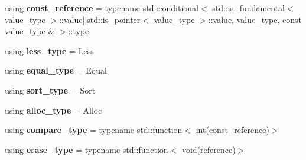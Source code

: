 \begin{DoxyCompactItemize}
\item 
\hypertarget{classrs_1_1_lazy_flat_set_a1eee0250aeecaaa0bc0c52ed44c44103}{using {\bfseries const\+\_\+reference} = typename std\+::conditional$<$ std\+::is\+\_\+fundamental$<$ value\+\_\+type $>$\+::value$\vert$$\vert$std\+::is\+\_\+pointer$<$ value\+\_\+type $>$\+::value, value\+\_\+type, const value\+\_\+type \& $>$\+::type}\label{classrs_1_1_lazy_flat_set_a1eee0250aeecaaa0bc0c52ed44c44103}

\item 
\hypertarget{classrs_1_1_lazy_flat_set_ad62702a8dd24dd6994f6de93a95ac06b}{using {\bfseries less\+\_\+type} = Less}\label{classrs_1_1_lazy_flat_set_ad62702a8dd24dd6994f6de93a95ac06b}

\item 
\hypertarget{classrs_1_1_lazy_flat_set_a4ceed88565e4ec459cabaa95d08b7543}{using {\bfseries equal\+\_\+type} = Equal}\label{classrs_1_1_lazy_flat_set_a4ceed88565e4ec459cabaa95d08b7543}

\item 
\hypertarget{classrs_1_1_lazy_flat_set_ad8b2f85dadbdab6708ea958a92efea81}{using {\bfseries sort\+\_\+type} = Sort}\label{classrs_1_1_lazy_flat_set_ad8b2f85dadbdab6708ea958a92efea81}

\item 
\hypertarget{classrs_1_1_lazy_flat_set_a3a7384c560080249b45a5f244859e7dd}{using {\bfseries alloc\+\_\+type} = Alloc}\label{classrs_1_1_lazy_flat_set_a3a7384c560080249b45a5f244859e7dd}

\item 
\hypertarget{classrs_1_1_lazy_flat_set_a8b0320d955fffb1457c512191b5f0b0b}{using {\bfseries compare\+\_\+type} = typename std\+::function$<$ int(const\+\_\+reference)$>$}\label{classrs_1_1_lazy_flat_set_a8b0320d955fffb1457c512191b5f0b0b}

\item 
\hypertarget{classrs_1_1_lazy_flat_set_add721f9ad9f6a52a08b31cf1f3b773fd}{using {\bfseries erase\+\_\+type} = typename std\+::function$<$ void(reference)$>$}\label{classrs_1_1_lazy_flat_set_add721f9ad9f6a52a08b31cf1f3b773fd}

\end{DoxyCompactItemize}
